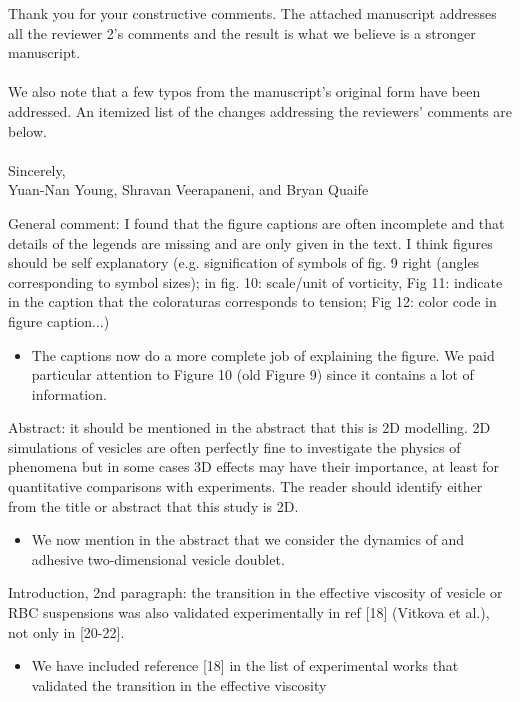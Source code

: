 \documentclass[11pt]{article}
\newcommand{\comment}[1]{{\color{blue} #1}}
\begin{document}
\noindent
Thank you for your constructive comments.  The attached manuscript
addresses all the reviewer 2's comments and the result is what we
believe is a stronger manuscript.
\\ \\ \noindent 
We also note that a few typos from the manuscript’s original form have
been addressed. An itemized list of the changes addressing the
reviewers’ comments are below.
\\ \\ \noindent 
Sincerely, \\ \noindent
Yuan-Nan Young, Shravan Veerapaneni, and Bryan Quaife

\vspace{20pt}
\noindent
\comment{General comment: I found that the figure captions are often
incomplete and that details of the legends are missing and are only
given in the text. I think figures should be self explanatory (e.g.
signification of symbols of fig. 9 right (angles corresponding to symbol
sizes); in fig. 10: scale/unit of vorticity, Fig 11: indicate in the
caption that the coloraturas corresponds to tension; Fig 12: color code
in figure caption...)}
\begin{itemize}
  \item The captions now do a more complete job of explaining the
    figure.  We paid particular attention to Figure 10 (old Figure 9)
    since it contains a lot of information.
\end{itemize}

\noindent
\comment{Abstract: it should be mentioned in the abstract that this is
2D modelling. 2D simulations of vesicles are often perfectly fine to
investigate the physics of phenomena but in some cases 3D effects may
have their importance, at least for quantitative comparisons with
experiments. The reader should identify either from the title or
abstract that this study is 2D.}
\begin{itemize}
  \item We now mention in the abstract that we consider the dynamics of
    and adhesive two-dimensional vesicle doublet.
\end{itemize}

\noindent
\comment{Introduction, 2nd paragraph: the transition in the effective
viscosity of vesicle or RBC suspensions was also validated
experimentally in ref [18] (Vitkova et al.), not only in [20-22].}
\begin{itemize}
  \item We have included reference [18] in the list of experimental
    works that validated the transition in the effective viscosity
\end{itemize}
\end{document}

